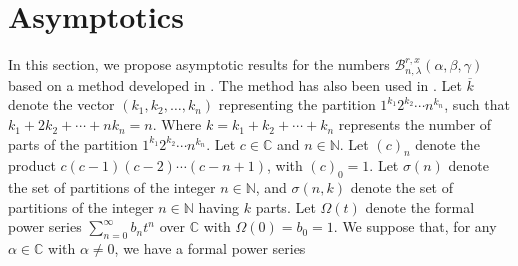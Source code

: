 \documentclass[12pt]{amsart}
\newtheorem{proof 1}{proof 1}
\newtheorem{theorem}{Theorem}[section]
\begin{document}

\section{Asymptotics\label{section:4}}
In this section, we propose asymptotic results for the numbers $\mathcal{B}^{r,x}_{n,\lambda}(\alpha,\beta,\gamma)$ based on a method developed in \cite{hsu1990power,hsu1991kind}. The method has also been used in \cite{JoseNkonkobeunified,corcino2020second,hsu1998unified,nkonkobe2020combinatorial}.  Let  $\overline{k}$ denote the vector $(k_1,k_2,\ldots,k_n)$  representing the partition $1^{k_1}2^{k_2}\cdots n^{k_n}$, such that $k_1+2k_2+\cdots+nk_n=n$. Where $k=k_1+k_2+\cdots+k_n$ represents the number of parts of the partition $1^{k_1}2^{k_2}\cdots n^{k_n}$. Let $c\in\mathbb{C}$ and $n\in\mathbb{N}$. Let $(c)_n$ denote the product $c(c-1)(c-2)\cdots(c-n+1)$, with $(c)_0=1$. Let  $\sigma(n)$ denote the set of partitions of the integer $n\in \mathbb{N}$, and  $\sigma(n,k)$ denote the set of partitions of the integer $n\in \mathbb{N}$ having $k$ parts. Let  $\Omega(t)$ denote the formal power series $\sum\limits_{n=0}^\infty b_nt^n$ over $\mathbb{C}$ with $\Omega(0)=b_0=1$. We suppose that, for any $\alpha\in \mathbb{C}$ with $\alpha\not= 0$, we have a formal power series
\end{document}
